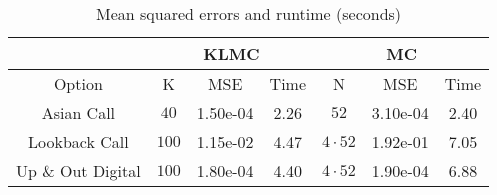 \begin{table}[H]
    \centering
\caption{Mean squared errors and runtime (seconds)}
\vspace{-3mm}
\begin{tabular}{ccccccc} 
\hline  & \multicolumn{3}{c}{KLMC}  & \multicolumn{3}{c}{MC} \\  \hline
Option & K & MSE  & Time & N & MSE & Time \\
\hline  
 Asian Call & $40$ & 1.50e-04 & 2.26 & $ 52$ & 3.10e-04 & 2.40\\ 
Lookback Call   & $100$ & 1.15e-02 & 4.47& $4\cdot 52$ & 1.92e-01 & 7.05 \\ 
Up \& Out Digital   & $100$ & 1.80e-04 & 4.40 & $4\cdot 52$ & 1.90e-04 & 6.88\\ \hline
\end{tabular}
\label{tab:results}
\end{table}
